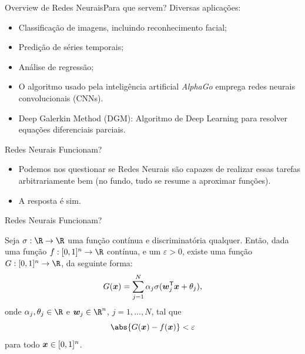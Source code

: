 \documentclass[13pt]{beamer}
\begin{document}
\begin{frame}{Overview de Redes Neurais}{Para que servem?}
    \vspace{2pt}
    Diversas aplicações:
    \begin{itemize}
        \item<1-> Classificação de imagens, incluindo reconhecimento facial;
        \item<2-> Predição de séries temporais;
        \item<3-> Análise de regressão;
        \item<4-> O algoritmo usado pela inteligência artificial \emph{AlphaGo} emprega redes neurais convolucionais (CNNs).
        \item<5-> Deep Galerkin Method (DGM): Algoritmo de Deep Learning para resolver equações diferenciais parciais.
    \end{itemize}
\end{frame}


\begin{frame}{Redes Neurais Funcionam?}
    \begin{itemize}
        \item<1-> Podemos nos questionar se Redes Neurais são capazes de realizar essas tarefas arbitrariamente bem (no fundo, tudo se resume a aproximar funções).
        \item<2-> A resposta é sim.
    \end{itemize}
\end{frame}

\begin{frame}{Redes Neurais Funcionam?}
    \begin{TAU}
        Seja \( \sigma : \R \to \R \) uma função contínua e discriminatória qualquer.
        Então, dada uma função \( f : [0, 1]^{ n } \to \R \) contínua, e um \( \varepsilon > 0 \), existe uma função \( G : [0, 1]^{ n } \to \R \), da seguinte forma:
        \begin{equation*}
            G ( \bm{x} ) = \sum_{ j=1 }^{ N } \alpha_{ j } \sigma ( \bm{w}_{ j }^{ \mathsf{T} } \bm{x} + \theta_{ j } )
        ,\end{equation*}
        onde \( \alpha_{ j }, \theta_{ j } \in \R \) e \( \bfw_{ j } \in \R^{ n } \), \( j = 1, \dots, N \), tal que
        \begin{equation*}
            \abs{ G ( \bfx ) - f ( \bfx ) } < \varepsilon
        \end{equation*}
        para todo \( \bm{x} \in [0, 1]^{ n } \).
    \end{TAU}
\end{frame}
\end{document}
